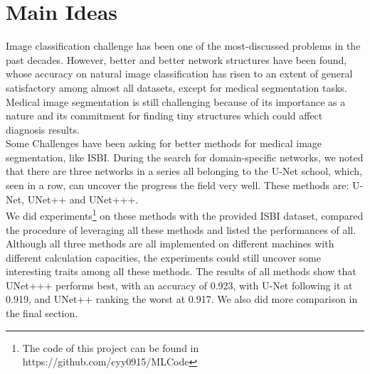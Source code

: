 \section{Main Ideas}
Image classification challenge has been one of the most-discussed problems in the past decades. However, better and better network structures have been found, whose accuracy on natural image classification has risen to an extent of general satisfactory among almost all datasets, except for medical segmentation tasks. Medical image segmentation is still challenging because of its importance as a nature and its commitment for finding tiny structures which could affect diagnosis results.\\

Some Challenges have been asking for better methods for medical image segmentation, like ISBI. During the search for domain-specific networks, we noted that there are three networks in a series all belonging to the U-Net school, which, seen in a row, can uncover the progress the field very well. These methods are: U-Net, UNet++ and UNet+++.\\

We did experiments\footnote{The code of this project can be found in https://github.com/cyy0915/MLCode} on these methods with the provided ISBI dataset, compared the procedure of leveraging all these methods and listed the performances of all. Although all three methods are all implemented on different machines with different calculation capacities, the experiments could still uncover some interesting traits among all these methods. The results of all methods show that UNet+++ performs best, with an accuracy of 0.923, with U-Net following it at 0.919, and UNet++ ranking the worst at 0.917. We also did more comparison in the final section.
